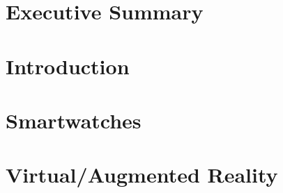 \documentclass[12pt, titlepage, onecolumn]{article}
\begin{document}
\begin{titlepage}

\end{titlepage}
\frontmatter
\section*{Executive Summary}

\clearpage
\begin{singlespace}
\tableofcontents
\clearpage
\end{singlespace}
\clearpage
\setlength{\parindent}{0em}
\setlength{\parskip}{1em}
\mainmatter

\section{Introduction}


\clearpage
\section{Smartwatches}


\clearpage
\section{Virtual/Augmented Reality}

\clearpage
\backmatter
\begin{singlespace}


\clearpage
\end{singlespace}
\end{document}
